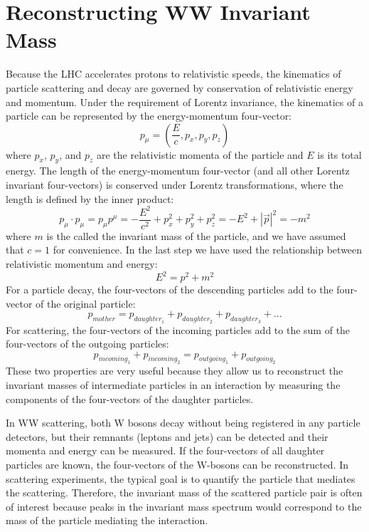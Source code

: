 \documentclass[10pt]{ucscthesisbs}
\begin{document}
\section{Reconstructing WW Invariant Mass}
Because the LHC accelerates protons to relativistic speeds, the kinematics of particle scattering and decay are governed by conservation of relativistic energy and momentum. Under the requirement of Lorentz invariance, the kinematics of a particle can be represented by the energy-momentum four-vector:
\begin{equation}p_{\mu} = (\frac{E}{c}, p_x, p_y, p_z) \end{equation}
where $p_x$, $p_y$, and $p_z$ are the relativistic momenta of the particle and $E$ is its total energy. The length of the energy-momentum four-vector (and all other Lorentz invariant four-vectors) is conserved under Lorentz transformations, where the length is defined by the inner product:
\begin{equation}p_{\mu} \cdot p_{\mu} = p_{\mu}p^{\mu} = -\frac{E^2}{c^2} + p_x^2 + p_y^2 + p_z^2 = -E^2 + |\vec{p}|^2 = -m^2\end{equation}
where $m$ is the called the invariant mass of the particle, and we have assumed that $c=1$ for convenience. In the last step we have used the relationship between relativistic momentum and energy:
\begin{equation}E^2 = p^2 + m^2 \end{equation}
For a particle decay, the four-vectors of the descending particles add to the four-vector of the original particle:
\begin{equation}p_{mother} = p_{daughter_1} + p_{daughter_2} + p_{daughter_3} + ...\end{equation}
For scattering, the four-vectors of the incoming particles add to the sum of the four-vectors of the outgoing particles:
\begin{equation}p_{incoming_1} + p_{incoming_2} = p_{outgoing_1} + p_{outgoing_2} \end{equation}
These two properties are very useful because they allow us to reconstruct the invariant masses of intermediate particles in an interaction by measuring the components of the four-vectors of the daughter particles. \par
 In WW scattering, both W bosons decay without being registered in any particle detectors, but their remnants (leptons and jets) can be detected and their momenta and energy can be measured. If the four-vectors of all daughter particles are known, the four-vectors of the W-bosons can be reconstructed.
In scattering experiments, the typical goal is to quantify the particle that mediates the scattering. Therefore, the invariant mass of the scattered particle pair is often of interest because peaks in the invariant mass spectrum would correspond to the mass of the particle mediating the interaction. 
\end{document}
